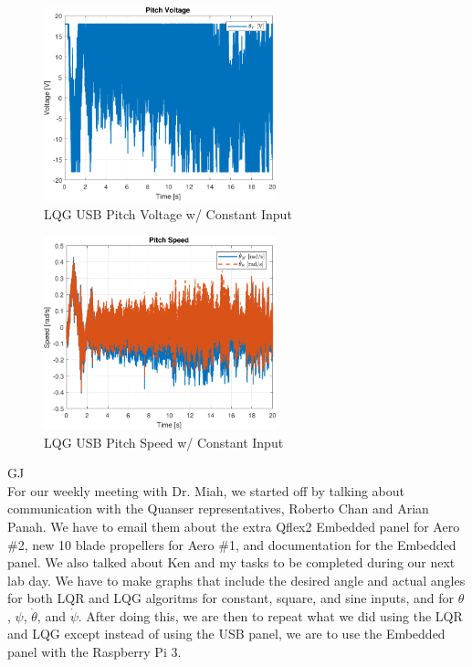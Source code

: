 \documentclass[fontsize=11pt, %
                             paper=letter, %
                             openany, %
                             captions=tableheading,
                             index=totoc,
                             hyperref]{labbook}
\begin{document}
\begin{addmargin}[0cm]{0cm}
\begin{figure}[h]
  \centering
  \includegraphics[width=0.6\textwidth]{figs/matlab/LQG_USB/Pitch_Volt_LQG_USB_CON}
  \caption{LQG USB Pitch Voltage w/ Constant Input}
  \label{fig:Pitch_Volt_LQG_USB_CON}
\end{figure}

\begin{figure}[h]
  \centering
  \includegraphics[width=0.6\textwidth]{figs/matlab/LQG_USB/Pitch_Speed_LQG_USB_CON}
  \caption{LQG USB Pitch Speed w/ Constant Input}
  \label{fig:Pitch_Speed_LQG_USB_CON}
\end{figure}

GJ\\
For our weekly meeting with Dr. Miah, we started off by talking about communication with the Quanser representatives, Roberto Chan and Arian Panah.  We have to email them about the extra Qflex2 Embedded panel for Aero \#2, new 10 blade propellers for Aero \#1, and documentation for the Embedded panel.  We also talked about Ken and my tasks to be completed during our next lab day.  We have to make graphs that include the desired angle and actual angles for both LQR and LQG algoritms for constant, square, and sine inputs, and for $\theta$, $\psi$, $\dot\theta$, and $\dot\psi$.  After doing this, we are then to repeat what we did using the LQR and LQG except instead of using the USB panel, we are to use the Embedded panel with the Raspberry Pi 3.


\end{addmargin}
\end{document}
